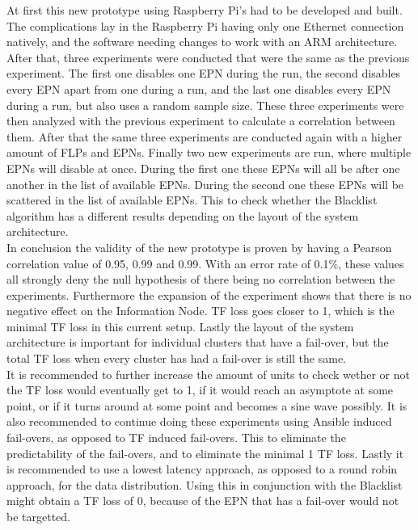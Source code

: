 At first this new prototype using Raspberry Pi's had to be developed and built. The complications lay in the Raspberry Pi having only one Ethernet connection natively, and the software needing changes to work with an ARM architecture. After that, three experiments were conducted that were the same as the previous experiment. The first one disables one EPN during the run, the second disables every EPN apart from one during a run, and the last one disables every EPN during a run, but also uses a random sample size. These three experiments were then analyzed with the previous experiment to calculate a correlation between them. After that the same three experiments are conducted again with a higher amount of FLPs and EPNs. Finally two new experiments are run, where multiple EPNs will disable at once. During the first one these EPNs will all be after one another in the list of available EPNs. During the second one these EPNs will be scattered in the list of available EPNs. This to check whether the Blacklist algorithm has a different results depending on the layout of the system architecture. \\
In conclusion the validity of the new prototype is proven by having a Pearson correlation value of 0.95, 0.99 and 0.99. With an error rate of 0.1\%, these values all strongly deny the null hypothesis of there being no correlation between the experiments. Furthermore the expansion of the experiment shows that there is no negative effect on the Information Node. TF loss goes closer to 1, which is the minimal TF loss in this current setup. Lastly the layout of the system architecture is important for individual clusters that have a fail-over, but the total TF loss when every cluster has had a fail-over is still the same. \\
It is recommended to further increase the amount of units to check wether or not the TF loss would eventually get to 1, if it would reach an asymptote at some point, or if it turns around at some point and becomes a sine wave possibly. It is also recommended to continue doing these experiments using Ansible induced fail-overs, as opposed to TF induced fail-overs. This to eliminate the predictability of the fail-overs, and to eliminate the minimal 1 TF loss. Lastly it is recommended to use a lowest latency approach, as opposed to a round robin approach, for the data distribution. Using this in conjunction with the Blacklist might obtain a TF loss of 0, because of the EPN that has a fail-over would not be targetted.
%